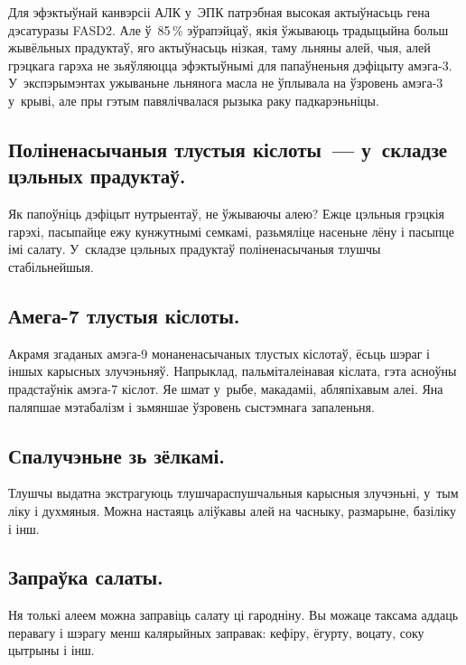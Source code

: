 Для эфэктыўнай канвэрсіі АЛК у~ЭПК патрэбная высокая актыўнасьць гена дэсатуразы FASD2. Але ў~85\,\% эўрапэйцаў, якія ўжываюць традыцыйна больш жывёльных прадуктаў, яго актыўнасьць нізкая, таму льняны алей, чыя, алей грэцкага гарэха не зьяўляюцца эфэктыўнымі для папаўненьня дэфіцыту амэга-3. У~экспэрымэнтах ужываньне льнянога масла не ўплывала на ўзровень амэга-3 у~крыві, але пры гэтым павялічвалася рызыка раку падкарэньніцы.

\subsection{Поліненасычаныя тлустыя кіслоты~--- у~складзе цэльных прадуктаў.}
Як папоўніць дэфіцыт нутрыентаў, не ўжываючы алею? Ежце цэльныя грэцкія гарэхі, пасыпайце ежу кунжутнымі семкамі, разьмяліце насеньне лёну і пасыпце імі салату. У~складзе цэльных прадуктаў поліненасычаныя тлушчы стабільнейшыя.

\subsection{Амега-7 тлустыя кіслоты.}
Акрамя згаданых амэга-9 монаненасычаных тлустых кіслотаў, ёсьць шэраг і іншых карысных злучэньняў. Напрыклад, пальміталеінавая кіслата, гэта асноўны прадстаўнік амэга-7 кіслот. Яе шмат у~рыбе, макадаміі, абляпіхавым алеі. Яна паляпшае мэтабалізм і зьмяншае ўзровень сыстэмнага запаленьня.

\subsection{Спалучэньне зь зёлкамі.}
Тлушчы выдатна экстрагуюць тлушчараспушчальныя карысныя злучэньні, у~тым ліку і духмяныя. Можна настаяць аліўкавы алей на часныку, размарыне, базіліку і інш.

\subsection{Запраўка салаты.}
Ня толькі алеем можна заправіць салату ці гародніну. Вы можаце таксама аддаць перавагу і шэрагу менш калярыйных заправак: кефіру, ёгурту, воцату, соку цытрыны і інш.

